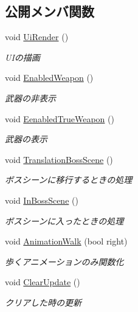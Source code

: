\subsection*{公開メンバ関数}
\begin{DoxyCompactItemize}
\item 
void \mbox{\hyperlink{class_player_a848c2ecb62431010eaa9298b2c2c4be0}{Ui\+Render}} ()
\begin{DoxyCompactList}\small\item\em U\+Iの描画 \end{DoxyCompactList}\item 
void \mbox{\hyperlink{class_player_a615af41886fe293fcc3c6f276de77991}{Enabled\+Weapon}} ()
\begin{DoxyCompactList}\small\item\em 武器の非表示 \end{DoxyCompactList}\item 
void \mbox{\hyperlink{class_player_a97012a8b2bead252582ff39e852961ac}{Eenabled\+True\+Weapon}} ()
\begin{DoxyCompactList}\small\item\em 武器の表示 \end{DoxyCompactList}\item 
void \mbox{\hyperlink{class_player_a662de093359fb8e4a5bdc86a34fd2549}{Translation\+Boss\+Scene}} ()
\begin{DoxyCompactList}\small\item\em ボスシーンに移行するときの処理 \end{DoxyCompactList}\item 
void \mbox{\hyperlink{class_player_aff4d2bffe97e2b70f47f5eac2da26562}{In\+Boss\+Scene}} ()
\begin{DoxyCompactList}\small\item\em ボスシーンに入ったときの処理 \end{DoxyCompactList}\item 
void \mbox{\hyperlink{class_player_af1b9f4482efa53508befe6de204a3da6}{Animation\+Walk}} (bool right)
\begin{DoxyCompactList}\small\item\em 歩くアニメーションのみ関数化 \end{DoxyCompactList}\item 
void \mbox{\hyperlink{class_player_a8b27da2bdfb3e25337c7b6fd345d21f2}{Clear\+Update}} ()
\begin{DoxyCompactList}\small\item\em クリアした時の更新 \end{DoxyCompactList}\item 

\end{DoxyCompactItemize}
